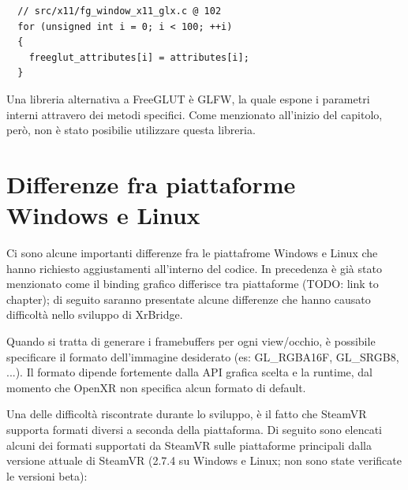 \documentclass[twoside]{supsistudent}
\begin{document}
\begin{verbatim}
  // src/x11/fg_window_x11_glx.c @ 102
  for (unsigned int i = 0; i < 100; ++i)
  {
    freeglut_attributes[i] = attributes[i];
  }
\end{verbatim}

Una libreria alternativa a FreeGLUT è GLFW, la quale espone i parametri interni attravero dei metodi specifici. Come menzionato all'inizio del capitolo, però, non è stato posibilie utilizzare questa libreria.

\section{Differenze fra piattaforme Windows e Linux}

Ci sono alcune importanti differenze fra le piattafrome Windows e Linux che hanno richiesto aggiustamenti all'interno del codice. In precedenza è già stato menzionato come il binding grafico differisce tra piattaforme (TODO: link to chapter); di seguito saranno presentate alcune differenze che hanno causato difficoltà nello sviluppo di XrBridge.

Quando si tratta di generare i framebuffers per ogni view/occhio, è possibile specificare il formato dell'immagine desiderato (es: GL\_RGBA16F, GL\_SRGB8, ...). Il formato dipende fortemente dalla API grafica scelta e la runtime, dal momento che OpenXR non specifica alcun formato di default.

Una delle difficoltà riscontrate durante lo sviluppo, è il fatto che SteamVR supporta formati diversi a seconda della piattaforma. Di seguito sono elencati alcuni dei formati supportati da SteamVR sulle piattaforme principali dalla versione attuale di SteamVR (2.7.4 su Windows e Linux; non sono state verificate le versioni beta):
\end{document}
